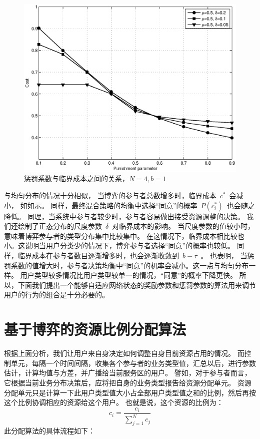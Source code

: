 \begin{figure}[!tb]
\begin{centering}
\includegraphics[scale=0.6]{bayesian_normal_punish_parameter_vs_contribute_probability.eps}
\caption{惩罚系数与临界成本之间的关系，$N=4, b=1$}
\label{fig:bayesian_normal_puni_para_vs_cont_prob}
\end{centering}
\end{figure}

与均匀分布的情况十分相似，
当博弈的参与者总数增多时，临界成本~$c^*$~会减小， 如如示。
同样，最终混合策略的均衡中选择“同意”的概率~$P(c_i^*)$~也会随之降低。
同理，当系统中参与者较少时，参与者容易做出接受资源调整的决策。
我们还绘制了正态分布的尺度参数~$\delta$~对临界成本的影响。
当尺度参数的值较小时，意味着博弈参与者的类型分布集中比较集中。
在这情况下，临界成本相比较也小。这说明当用户分类少的情况下，博弈参与者选择“同意”的概率也较低。
同样，临界成本在参与者数目逐渐增多时，也会逐渐收敛到~$b-\tau$~。
也表明，
当惩罚系数的值增大时，参与者决策均衡中“同意”的机率会减小。这一点与均匀分布一样。
用户类型较多情况比用户类型较单一的情况，“同意”的概率下降更快。
所以，下面我们提出一个能够自适应网络状态的奖励参数和惩罚参数的算法用来调节用户的行为的组合是十分必要的。

\section{基于博弈的资源比例分配算法}
根据上面分析，我们让用户来自身决定如何调整自身目前资源占用的情况。
而控制单元，每隔一个时间间隔，收集各个参与者的业务类型值，汇总以后，进行参数估计，计算均值与方差，并广播给当前服务区的用户。
譬如，对于参与者而言，它根据当前业务分布决策后，应将把自身的业务类型报告给资源分配单元。
资源分配单元只是计算一下此用户类型值大小占全部用户类型值之和的比例，然后再按这个比例协调相应的资源给这个用户。
也就是说，这个资源的比例为：
\begin{equation}
    c_i = \frac{c_i}{\sum_{j=1}^N c_j}
    \label{eqn:chap_bayesian:resource_ratio}
\end{equation}
此分配算法的具体流程如下：

